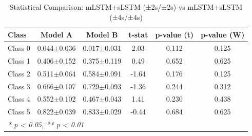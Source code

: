 \begin{table}[htbp]
\centering
\caption{Statistical Comparison: mLSTM+sLSTM (±2s/±2s) vs mLSTM+sLSTM (±4s/±4s)}
\label{tab:comparison_class_mlstmslstm_±2s_±2s_vs_mlstmslstm_±4s_±4s}
\begin{tabular}{lccccc}
\toprule
\textbf{Class} & \textbf{Model A} & \textbf{Model B} & \textbf{t-stat} & \textbf{p-value (t)} & \textbf{p-value (W)} \\
\midrule
Class 0 & 0.044$\pm$0.036 & 0.017$\pm$0.031 & 2.03 & 0.112 & 0.125 \\
Class 1 & 0.406$\pm$0.152 & 0.375$\pm$0.119 & 0.49 & 0.652 & 0.625 \\
Class 2 & 0.511$\pm$0.064 & 0.584$\pm$0.091 & -1.64 & 0.176 & 0.125 \\
Class 3 & 0.666$\pm$0.107 & 0.729$\pm$0.093 & -1.36 & 0.244 & 0.312 \\
Class 4 & 0.552$\pm$0.102 & 0.467$\pm$0.043 & 1.41 & 0.230 & 0.438 \\
Class 5 & 0.822$\pm$0.039 & 0.833$\pm$0.029 & -0.44 & 0.684 & 0.625 \\
\bottomrule
\multicolumn{6}{l}{\textit{* p < 0.05, ** p < 0.01}} \\
\end{tabular}
\end{table}